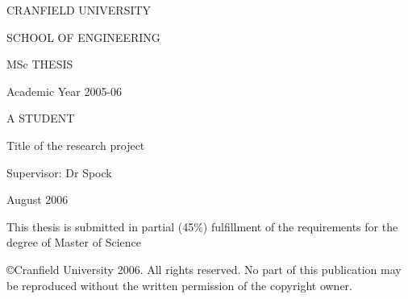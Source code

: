 \thispagestyle{empty}

\large \begin{center}

\vspace{30mm}

CRANFIELD UNIVERSITY

\vspace{20mm}

SCHOOL OF ENGINEERING

\vspace{15mm}

MSc THESIS

\vspace{15mm}

Academic Year 2005-06

\vspace{15mm} \Large

A STUDENT

\vspace{15mm}

Title of the research project

\vspace{20mm} \large

Supervisor: \hspace{30mm} Dr Spock

\vspace{10mm}

August 2006

\vspace{10mm} \normalsize


This thesis is submitted in partial (45\%) fulfillment of the
requirements for the degree of Master of Science

\vspace{10mm}

\copyright Cranfield University 2006.  All rights reserved.  No
part of this publication may be reproduced without the written
permission of the copyright owner.

\end{center}

\pagebreak


\thispagestyle{empty}

\mbox

\pagebreak
